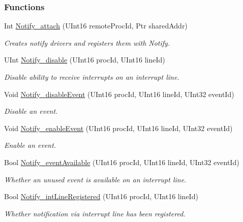 \subsubsection*{Functions}
\begin{DoxyCompactItemize}
\item 
Int \hyperlink{_notify_8h_a2d6e7fc00357b58ddc2a860e6bd4bf80}{Notify\-\_\-attach} (U\-Int16 remote\-Proc\-Id, Ptr shared\-Addr)
\begin{DoxyCompactList}\small\item\em Creates notify drivers and registers them with Notify. \end{DoxyCompactList}\item 
U\-Int \hyperlink{_notify_8h_a0eeb5a2e898a287ec0e31be4e6a92364}{Notify\-\_\-disable} (U\-Int16 proc\-Id, U\-Int16 line\-Id)
\begin{DoxyCompactList}\small\item\em Disable ability to receive interrupts on an interrupt line. \end{DoxyCompactList}\item 
Void \hyperlink{_notify_8h_acb0512fe9bdbc30a1bd6d055d3c662d0}{Notify\-\_\-disable\-Event} (U\-Int16 proc\-Id, U\-Int16 line\-Id, U\-Int32 event\-Id)
\begin{DoxyCompactList}\small\item\em Disable an event. \end{DoxyCompactList}\item 
Void \hyperlink{_notify_8h_a701ab77f8cd9b811dcca05e243815b85}{Notify\-\_\-enable\-Event} (U\-Int16 proc\-Id, U\-Int16 line\-Id, U\-Int32 event\-Id)
\begin{DoxyCompactList}\small\item\em Enable an event. \end{DoxyCompactList}\item 
Bool \hyperlink{_notify_8h_a35609c7bf129016087dd520be69c14cf}{Notify\-\_\-event\-Available} (U\-Int16 proc\-Id, U\-Int16 line\-Id, U\-Int32 event\-Id)
\begin{DoxyCompactList}\small\item\em Whether an unused event is available on an interrupt line. \end{DoxyCompactList}\item 
Bool \hyperlink{_notify_8h_a696ca01e7ee01649e5685081f6f8a425}{Notify\-\_\-int\-Line\-Registered} (U\-Int16 proc\-Id, U\-Int16 line\-Id)
\begin{DoxyCompactList}\small\item\em Whether notification via interrupt line has been registered. \end{DoxyCompactList}\item 

\end{DoxyCompactItemize}
